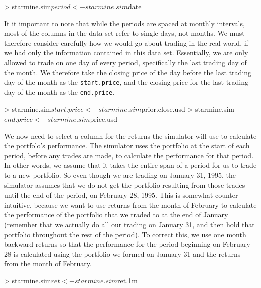 \documentclass{article}
\begin{document}
\begin{Schunk}
\begin{Sinput}
> starmine.sim$period <- starmine.sim$date
\end{Sinput}
\end{Schunk}

It it important to note that while the periods are spaced at monthly
intervals, most of the columns in the data set refer to single days,
not months.  We must therefore consider carefully how we would go
about trading in the real world, if we had only the information
contained in this data set.  Essentially, we are only allowed to trade
on one day of every period, specifically the last trading day of the
month.  We therefore take the closing price of the day before the last
trading day of the month as the \texttt{start.price}, and the closing
price for the last trading day of the month as the \texttt{end.price}.

\begin{Schunk}
\begin{Sinput}
> starmine.sim$start.price <- starmine.sim$prior.close.usd
> starmine.sim$end.price <- starmine.sim$price.usd
\end{Sinput}
\end{Schunk}

We now need to select a column for the returns the simulator will use
to calculate the portfolo's performance.  The simulator uses the
portfolio at the start of each period, before any trades are made, to
calculate the performance for that period.  In other words, we assume
that it takes the entire span of a period for us to trade to a new
portfolio.  So even though we are trading on January 31, 1995, the
simulator assumes that we do not get the portfolio resulting from those
trades until the end of the period, on February 28, 1995.  This is
somewhat counter-intuitive, because we want to use returns from the
month of February to calculate the performance of the portfolio that
we traded to at the end of January (remember that we actually do all
our trading on January 31, and then hold that portfolio throughout the
rest of the period).  To correct this, we use one month backward
returns so that the performance for the period beginning on February
28 is calculated using the portfolio we formed on January 31 and the
returns from the month of February.

\begin{Schunk}
\begin{Sinput}
> starmine.sim$ret <- starmine.sim$ret.1m
\end{Sinput}
\end{Schunk}
\end{document}
